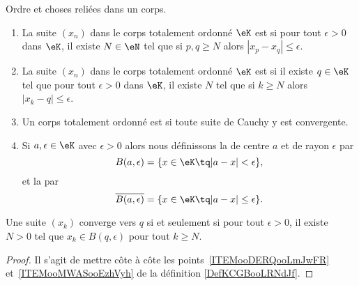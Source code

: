 \begin{definition}      \label{DefKCGBooLRNdJf}
	Ordre et choses reliées dans un corps.
	\begin{enumerate}

		\item       \label{ItemVXOZooTYpcYN}
		      La suite \( (x_n)\) dans le corps totalement ordonné \( \eK\) est  si pour tout \( \epsilon>0\) dans \( \eK\), il existe \( N\in \eN\) tel que si \( p,q\geq N\) alors \( | x_p-x_q |\leq \epsilon\).
		\item       \label{ITEMooDERQooLmJwFR}
		      La suite \( (x_n)\) dans le corps totalement ordonné \( \eK\) est  si il existe \( q\in \eK\) tel que pour tout \( \epsilon>0\) dans \( \eK\), il existe \( N\) tel que si \( k\geq N\) alors \( | x_k-q |\leq \epsilon\).

		\item       \label{ITEMooKZZYooDaidGU}
		      Un corps totalement ordonné est  si toute suite de Cauchy y est convergente.
		\item       \label{ITEMooMWASooEzhVyh}
		      Si \( a,\epsilon\in \eK\) avec \( \epsilon>0\) alors nous définissons la  de centre \( a\) et de rayon \( \epsilon\) par
		      \begin{equation}
			      B(a,\epsilon)=\{ x\in \eK\tq | a-x |<\epsilon \},
		      \end{equation}
		      et la  par
		      \begin{equation}
			      \overline{ B(a,\epsilon) }=\{ x\in \eK\tq | a-x |\leq \epsilon \}.
		      \end{equation}
	\end{enumerate}
\end{definition}

\begin{lemma}
	Une suite \( (x_k)\) converge vers \( q\) si et seulement si pour tout \( \epsilon>0\), il existe \( N>0\) tel que \( x_k\in B(q,\epsilon)\) pour tout \( k\geq N\).
\end{lemma}

\begin{proof}
	Il s'agit de mettre côte à côte les points~\ref{ITEMooDERQooLmJwFR} et~\ref{ITEMooMWASooEzhVyh} de la définition \ref{DefKCGBooLRNdJf}.
\end{proof}


